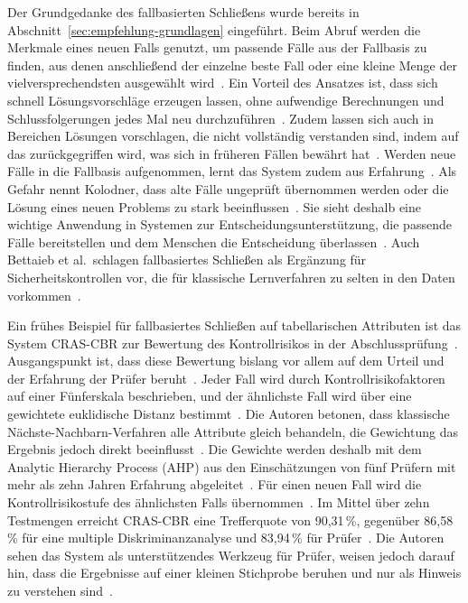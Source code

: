 Der Grundgedanke des fallbasierten Schließens wurde bereits in Abschnitt~\ref{sec:empfehlung-grundlagen} eingeführt.
Beim Abruf werden die Merkmale eines neuen Falls genutzt, um passende Fälle aus der Fallbasis zu finden, aus denen anschließend der einzelne beste Fall oder eine kleine Menge der vielversprechendsten ausgewählt wird~\cite[S.~22]{Kolodner1992}.
Ein Vorteil des Ansatzes ist, dass sich schnell Lösungsvorschläge erzeugen lassen, ohne aufwendige Berechnungen und Schlussfolgerungen jedes Mal neu durchzuführen~\cite[S.~29]{Kolodner1992}.
Zudem lassen sich auch in Bereichen Lösungen vorschlagen, die nicht vollständig verstanden sind, indem auf das zurückgegriffen wird, was sich in früheren Fällen bewährt hat~\cite[S.~29]{Kolodner1992}.
Werden neue Fälle in die Fallbasis aufgenommen, lernt das System zudem aus Erfahrung~\cite[S.~6]{Kolodner1992}.
Als Gefahr nennt Kolodner, dass alte Fälle ungeprüft übernommen werden oder die Lösung eines neuen Problems zu stark beeinflussen~\cite[S.~30]{Kolodner1992}.
Sie sieht deshalb eine wichtige Anwendung in Systemen zur Entscheidungsunterstützung, die passende Fälle bereitstellen und dem Menschen die Entscheidung überlassen~\cite[S.~30, 32]{Kolodner1992}.
Auch Bettaieb et al.\ schlagen fallbasiertes Schließen als Ergänzung für Sicherheitskontrollen vor, die für klassische Lernverfahren zu selten in den Daten vorkommen~\cite[S.~2552, 2577]{Bettaieb2020}.

Ein frühes Beispiel für fallbasiertes Schließen auf tabellarischen Attributen ist das System CRAS-CBR zur Bewertung des Kontrollrisikos in der Abschlussprüfung~\cite[S.~22]{Hwang2004}.
Ausgangspunkt ist, dass diese Bewertung bislang vor allem auf dem Urteil und der Erfahrung der Prüfer beruht~\cite[S.~22]{Hwang2004}.
Jeder Fall wird durch Kontrollrisikofaktoren auf einer Fünferskala beschrieben, und der ähnlichste Fall wird über eine gewichtete euklidische Distanz bestimmt~\cite[S.~27]{Hwang2004}.
Die Autoren betonen, dass klassische Nächste-Nachbarn-Verfahren alle Attribute gleich behandeln, die Gewichtung das Ergebnis jedoch direkt beeinflusst~\cite[S.~28]{Hwang2004}.
Die Gewichte werden deshalb mit dem Analytic Hierarchy Process (AHP) aus den Einschätzungen von fünf Prüfern mit mehr als zehn Jahren Erfahrung abgeleitet~\cite[S.~28]{Hwang2004}.
Für einen neuen Fall wird die Kontrollrisikostufe des ähnlichsten Falls übernommen~\cite[S.~29]{Hwang2004}.
Im Mittel über zehn Testmengen erreicht CRAS-CBR eine Trefferquote von 90,31\,\%, gegenüber 86,58\,\% für eine multiple Diskriminanzanalyse und 83,94\,\% für Prüfer~\cite[S.~29]{Hwang2004}.
Die Autoren sehen das System als unterstützendes Werkzeug für Prüfer, weisen jedoch darauf hin, dass die Ergebnisse auf einer kleinen Stichprobe beruhen und nur als Hinweis zu verstehen sind~\cite[S.~30]{Hwang2004}.

